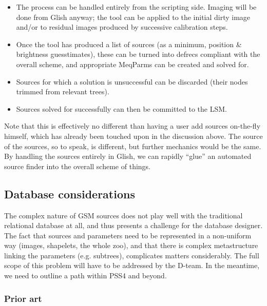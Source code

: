 \documentclass[]{lofar}
\begin{document}
  \begin{itemize} 
  
  \item The process can be handled entirely from the scripting side. Imaging 
  will be done from Glish anyway; the tool can be applied to the initial dirty
  image and/or to residual images produced by successive calibration steps.
  
  \item Once the tool has produced a list of sources (as a minimum, position \&
  brightness guesstimates), these can be turned into defrecs compliant with the
  overall scheme, and appropriate MeqParms can be created and solved for.
  
  \item Sources for which a solution is unsuccessful can be discarded (their
  nodes trimmed from relevant trees). 
  
  \item Sources solved for successfully can then be committed to the LSM. 
  \end{itemize}
  
  Note that this is effectively no different than having a user add sources
  on-the-fly himself, which has already been touched upon in the discussion
  above. The source of the sources, so to speak, is different, but further
  mechanics would be the same. By handling the sources entirely in Glish, we can
  rapidly  ``glue'' an automated source finder into the overall scheme of things.
  
\subsection{Database considerations}
  
  The complex nature of GSM sources does not play well with the traditional
  relational database at all, and thus presents a challenge for the database
  designer. The fact that sources and parameters need to be represented in a
  non-uniform way (images, shapelets, the whole zoo), and that there is complex
  metastructure linking the parameters (e.g. subtrees), complicates matters
  considerably. The full scope of this problem will have to be addressed by the
  D-team. In the meantime, we need to outline a path within PSS4 and beyond.
  
\subsubsection{Prior art}
  
\end{document}
